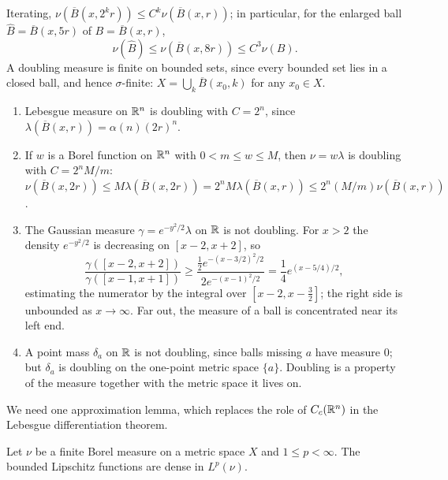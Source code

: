 Iterating, $\nu(\overline{B}(x, 2^kr)) \leq C^k\nu(\overline{B}(x, r))$; in particular, for the enlarged ball $\widehat{B} = \overline{B}(x, 5r)$ of $B = \overline{B}(x, r)$,
\begin{equation}\label{measure-theory:equation-doubling-five}
\nu(\widehat{B}) \leq \nu(\overline{B}(x, 8r)) \leq C^3\nu(B) .
\end{equation}
A doubling measure is finite on bounded sets, since every bounded set lies in a closed ball, and hence $\sigma$-finite: $X = \bigcup_k\overline{B}(x_0, k)$ for any $x_0 \in X$.

\begin{example}\label{measure-theory:example-doubling}
\begin{enumerate}
\item Lebesgue measure on $\mathbb{R}^n$ is doubling with $C = 2^n$, since $\lambda(\overline{B}(x, r)) = \alpha(n)(2r)^n$.
\item If $w$ is a Borel function on $\mathbb{R}^n$ with $0 < m \leq w \leq M$, then $\nu = w\lambda$ is doubling with $C = 2^nM/m$:
$\nu(\overline{B}(x, 2r)) \leq M\lambda(\overline{B}(x, 2r)) = 2^nM\lambda(\overline{B}(x, r)) \leq 2^n(M/m)\nu(\overline{B}(x, r))$.
\item The Gaussian measure $\gamma = e^{-y^2/2}\lambda$ on $\mathbb{R}$ is not doubling. For $x > 2$ the density $e^{-y^2/2}$ is decreasing on $[x - 2, x + 2]$, so
\[
\frac{\gamma([x - 2, x + 2])}{\gamma([x - 1, x + 1])} \geq \frac{\frac12e^{-(x - 3/2)^2/2}}{2e^{-(x - 1)^2/2}} = \frac14e^{(x - 5/4)/2},
\]
estimating the numerator by the integral over $[x - 2, x - \frac32]$; the right side is unbounded as $x \to \infty$. Far out, the measure of a ball is concentrated near its left end.
\item A point mass $\delta_a$ on $\mathbb{R}$ is not doubling, since balls missing $a$ have measure $0$; but $\delta_a$ is doubling on the one-point metric space $\{a\}$. Doubling is a property of the measure
together with the metric space it lives on.
\end{enumerate}
\end{example}

We need one approximation lemma, which replaces the role of $C_c(\mathbb{R}^n)$ in the Lebesgue differentiation theorem.

\begin{lemma}\label{measure-theory:lemma-lipschitz-dense}
Let $\nu$ be a finite Borel measure on a metric space $X$ and $1 \leq p < \infty$. The bounded Lipschitz functions are dense in $L^p(\nu)$.
\end{lemma}

